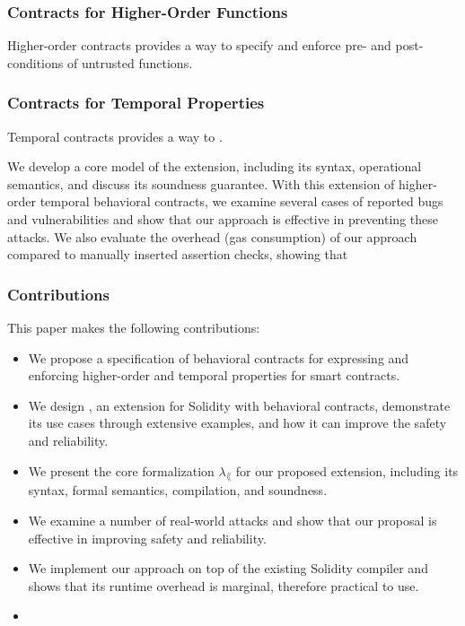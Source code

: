 \documentclass[acmsmall,review,anonymous]{acmart}\settopmatter{printfolios=true,printccs=false,printacmref=false}
\begin{document}
\subsubsection*{\textbf{Contracts for Higher-Order Functions}}
Higher-order contracts provides a way to specify and enforce pre- and
post-conditions of untrusted functions. 


\subsubsection*{\textbf{Contracts for Temporal Properties}}
Temporal contracts provides a way to .


We develop a core model of the extension, including its syntax,
operational semantics, and discuss its soundness guarantee.
With this extension of higher-order temporal behavioral contracts, we examine
several cases of reported bugs and vulnerabilities and show that
our approach is effective in preventing these attacks.
We also evaluate the overhead (gas consumption) of our approach
compared to manually inserted assertion checks, showing that 




\subsubsection*{\textbf{Contributions}} This paper makes the following contributions:
\begin{itemize}
	\item We propose a specification of behavioral contracts for expressing and
	      enforcing higher-order and temporal properties for smart contracts.
	\item We design \lang, an extension for Solidity with
	      behavioral contracts, demonstrate its use cases through extensive examples,
	      and how it can improve the safety and reliability.
	\item We present the core formalization $\lambda_\lang$ for our proposed
	      extension, including its syntax, formal semantics, compilation, and
	      soundness.
	\item We examine a number of real-world attacks and show that our proposal is
	      effective in improving safety and reliability.
	\item We implement our approach on top of the existing Solidity compiler and shows
	      that its runtime overhead is marginal, therefore practical to use.
	\item {}
\end{itemize}
\end{document}
